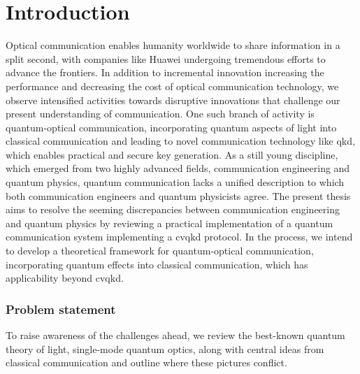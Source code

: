 \chapter*{Introduction}

Optical communication enables humanity worldwide to share information in a split second, with companies like Huawei undergoing tremendous efforts to advance the frontiers.
In addition to incremental innovation increasing the performance and decreasing the cost of optical communication technology, we observe intensified activities towards disruptive innovations that challenge our present understanding of communication.
One such branch of activity is quantum-optical communication, incorporating quantum aspects of light into classical communication and leading to novel communication technology like \gls{qkd}, which enables practical and secure key generation.
As a still young discipline, which emerged from two highly advanced fields, communication engineering and quantum physics, quantum communication lacks a unified description to which both communication engineers and quantum physicists agree.
The present thesis aims to resolve the seeming discrepancies between communication engineering and quantum physics by reviewing a practical implementation of a quantum communication system implementing a \gls{cvqkd} protocol.
In the process, we intend to develop a theoretical framework for quantum-optical communication, incorporating quantum effects into classical communication, which has applicability beyond \gls{cvqkd}.

\subsection*{Problem statement}

To raise awareness of the challenges ahead, we review the best-known quantum theory of light, single-mode quantum optics, along with central ideas from classical communication and outline where these pictures conflict.

